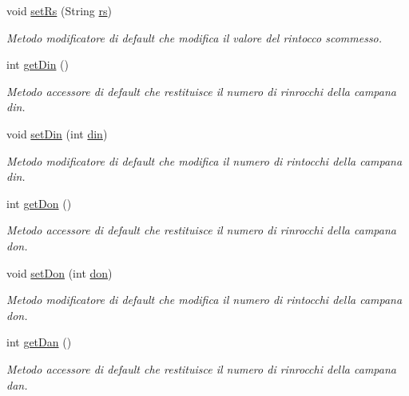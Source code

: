\begin{DoxyCompactItemize}
void \hyperlink{classcampane_1_1_dati_condivisi_a2dbdf2681bac5f1e5628fb145daa119d}{set\+Rs} (String \hyperlink{classcampane_1_1_dati_condivisi_a2a2ac2d508a6792e74d24e27bd656ef9}{rs})
\begin{DoxyCompactList}\small\item\em Metodo modificatore di default che modifica il valore del rintocco scommesso. \end{DoxyCompactList}\item 
int \hyperlink{classcampane_1_1_dati_condivisi_a7895c089a1adbd4cf6dda1d8b849596b}{get\+Din} ()
\begin{DoxyCompactList}\small\item\em Metodo accessore di default che restituisce il numero di rinrocchi della campana \textquotesingle{}din\textquotesingle{}. \end{DoxyCompactList}\item 
void \hyperlink{classcampane_1_1_dati_condivisi_a0efe7c0aafacd9cfc6b099e007885ee8}{set\+Din} (int \hyperlink{classcampane_1_1_dati_condivisi_a7f432241955f773b6cc92136a349bf87}{din})
\begin{DoxyCompactList}\small\item\em Metodo modificatore di default che modifica il numero di rintocchi della campana \textquotesingle{}din\textquotesingle{}. \end{DoxyCompactList}\item 
int \hyperlink{classcampane_1_1_dati_condivisi_a6ba617c5159f591a47f3e48ed45d0cac}{get\+Don} ()
\begin{DoxyCompactList}\small\item\em Metodo accessore di default che restituisce il numero di rinrocchi della campana \textquotesingle{}don\textquotesingle{}. \end{DoxyCompactList}\item 
void \hyperlink{classcampane_1_1_dati_condivisi_a423462972930fdb769f394b1693b3415}{set\+Don} (int \hyperlink{classcampane_1_1_dati_condivisi_ad91fff4fe648ed3a29461c07bef850da}{don})
\begin{DoxyCompactList}\small\item\em Metodo modificatore di default che modifica il numero di rintocchi della campana \textquotesingle{}don\textquotesingle{}. \end{DoxyCompactList}\item 
int \hyperlink{classcampane_1_1_dati_condivisi_a5575d5b4f01a453d789f4a41fa3b5ba0}{get\+Dan} ()
\begin{DoxyCompactList}\small\item\em Metodo accessore di default che restituisce il numero di rinrocchi della campana \textquotesingle{}dan\textquotesingle{}. \end{DoxyCompactList}\item 

\end{DoxyCompactItemize}
